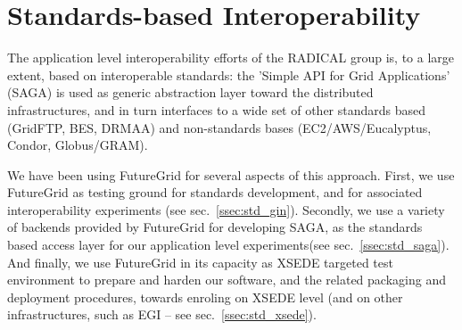 \documentclass[]{paper}
\newcommand{\jhanote}[1]{ {\textcolor{red} { ***shantenu: #1 }}}
\newcommand{\alnote}[1]{ {\textcolor{green} { ***andreL: #1 }}}
\newcommand{\alnote}[1]{}
\newcommand{\jhanote}[1]{}
\begin{document}
% 
% 

\section{Standards-based Interoperability}
\label{sec:standards}

The application level interoperability efforts of the RADICAL group
is, to a large extent, based on interoperable standards:  the 'Simple
API for Grid Applications' (SAGA) is used as generic abstraction
layer toward the  distributed infrastructures, and in turn interfaces
to a wide set of other standards based (GridFTP, BES, DRMAA)
and non-standards bases (EC2/AWS/Eucalyptus, Condor, Globus/GRAM).

We have been using FutureGrid for several aspects of this approach.
First, we use FutureGrid as testing ground for standards development,
and for associated interoperability experiments
(see sec.~\ref{ssec:std_gin}).  Secondly, we use a variety of backends
provided by FutureGrid for developing SAGA, as the standards based
access layer for our application level
experiments(see sec.~\ref{ssec:std_saga}).  And finally, we use FutureGrid
in its capacity as XSEDE targeted test environment to prepare and
harden our software, and the related packaging and deployment
procedures, towards enroling on XSEDE level (and on other
infrastructures, such as EGI -- see sec.~\ref{ssec:std_xsede}).
\end{document}
